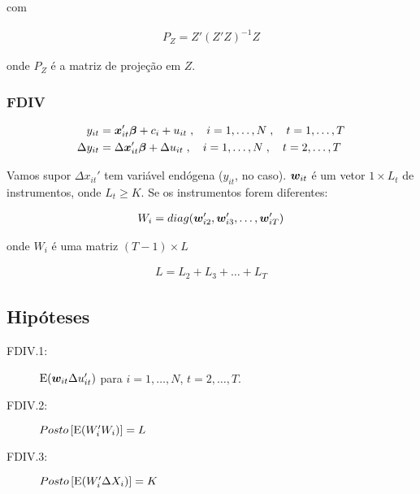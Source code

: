 \documentclass[11pt, oneside, a4paper, article]{article}
\numberwithin{equation}{section}
\begin{document}
\begin{description}
	\noindent
	com

	\vspace{-1 em}
	\begin{align*}
		\boxed{P_{Z} = Z'(Z'Z)^{-1}Z }
	\end{align*}

	\noindent
	onde
	$P_{Z}$ é a matriz de projeção em $Z$.

	\subsubsection{FDIV}

	\vspace{-1 em}
	\begin{align*}
		y_{it} &= \boldsymbol{x}_{it}' \boldsymbol{\beta} + c_{i} + u_{it}
		\; , \quad i = 1, \dots, N
		\; , \quad t = 1, \dots, T
		\\
		\Delta y_{it} &= \Delta \boldsymbol{x}_{it}' \boldsymbol{\beta} + \Delta u_{it}
		\; , \quad i = 1, \dots, N
		\; , \quad t = 2, \dots, T
	\end{align*}

	Vamos supor $\Delta x_{it}'$ tem variável endógena ($y_{it}$, no caso).
	$\boldsymbol{w}_{it}$ é um vetor $1 \times L_{t}$ de instrumentos, onde $L_{t} \geq K$.
	Se os instrumentos forem diferentes:

	\vspace{-1 em}
	\begin{align*}
		W_{i} = diag( \boldsymbol{w}_{i2}', \boldsymbol{w}_{i3}', \dots, \boldsymbol{w}_{iT}')
	\end{align*}

	\noindent
	onde $W_{i}$ é uma matriz $( T - 1 ) \times L$

	\vspace{-1 em}
	\begin{align*}
		L = L_{2} + L_{3} + \dots + L_{T}
	\end{align*}

	\subsection{Hipóteses}

	\begin{description}
		\item[FDIV.1:] $\text{E}( \boldsymbol{w}_{it} \Delta u_{it}')$ para $i = 1, \dots, N$, $t = 2, \dots, T$.
		\item[FDIV.2:] $Posto\left[ \text{E}( W_{i}' W_{i} ) \right] = L$
		\item[FDIV.3:] $Posto\left[ \text{E}( W_{i}' \Delta X_{i} ) \right] = K$
	\end{description}


\end{description}
\end{document}
